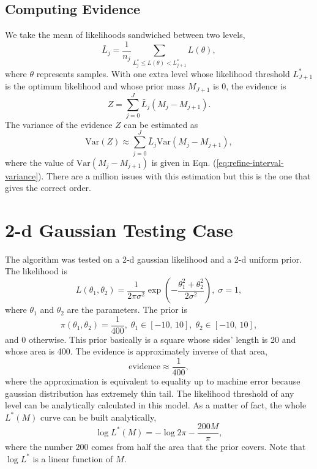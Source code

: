 \documentclass[letterpaper, preprint]{aastex}
\newcommand{\qer}[1]{{\color{red}#1}}
\begin{document}
\subsection{Computing Evidence}
We take the mean of likelihoods sandwiched between two levels,
\begin{equation}
\bar{L}_j= \frac{1}{n_j}\sum_{L_j^*\leq L(\theta)<L_{j+1}^*} L(\theta),
\end{equation}
where $\theta$ represents samples. With one extra level whose likelihood threshold $L^*_{J+1}$ is the optimum likelihood and whose prior mass $M_{J+1}$ is 0, the evidence is
\begin{equation}
Z = \sum_{j=0}^{J} \bar{L}_j (M_j - M_{j+1}).
\end{equation}
The variance of the evidence $Z$ can be estimated as
\begin{equation}
\mathrm{Var}(Z) \approx \sum_{j=0}^{J} \bar{L}_j \mathrm{Var}(M_j-M_{j+1}),
\end{equation}
where the value of $\mathrm{Var}(M_j-M_{j+1})$ is given in Eqn. (\ref{eq:refine-interval-variance}). \qer{There are a million issues with this estimation but this is the one that gives the correct order.}


\section{2-d Gaussian Testing Case}
The algorithm was tested on a 2-d gaussian likelihood and a 2-d uniform prior. The likelihood is
\begin{equation}
L(\theta_1,\theta_2)=\frac{1}{2\pi\sigma^2}\exp{\left(-\frac{\theta_1^2+\theta_2^2}{2\sigma^2}\right)},\;\sigma = 1,
\label{eq:likelihood2}
\end{equation}
where $\theta_1$ and $\theta_2$ are the parameters. The prior is
\begin{equation}
\pi(\theta_1,\theta_2) = \frac{1}{400},\;\theta_1\in[-10,\,10],\;\theta_2\in[-10,\,10],
\label{eq:prior2}
\end{equation}
and 0 otherwise. This prior basically is a square whose sides' length is 20 and whose area is 400. The evidence is approximately inverse of that area,
\begin{equation}
\mathrm{evidence} \approx \frac{1}{400},
\end{equation}
where the approximation is equivalent to equality up to machine error because gaussian distribution has extremely thin tail. The likelihood threshold of any level can be analytically calculated in this model. As a matter of fact, the whole $L^*(M)$ curve can be built analytically,
\begin{equation}
\log{L^*(M)}=-\log{2\pi}-\frac{200M}{\pi},
\label{eq:analytical-threshold}
\end{equation}
where the number $200$ comes from half the area that the prior covers. Note that $\log{L^*}$ is a linear function of $M$.
\end{document}
